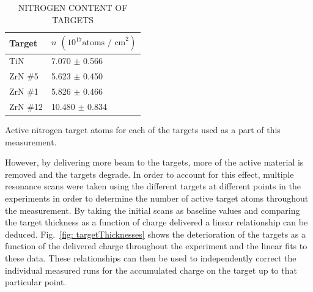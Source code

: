 \begin{table}[]
\caption{NITROGEN CONTENT OF TARGETS}
\centering
\begin{threeparttable}
\begin{tabular}{@{}ll@{}}
\toprule
Target & $n$ $\left(10^{17} \text{atoms / cm}^{2} \right)$ \\ \midrule
TiN    & 7.070 $\pm$ 0.566                        \\
ZrN \#5  & 5.623 $\pm$ 0.450                        \\
ZrN \#1  & 5.826 $\pm$ 0.466                        \\
ZrN \#12 & 10.480 $\pm$ 0.834                       \\ \bottomrule
\end{tabular}
\begin{tablenotes}
\small
\item Active nitrogen target atoms for each of the targets used as a part of this measurement. 
\end{tablenotes}
\end{threeparttable}
\label{tbl: targetAtoms}
\end{table}


However, by delivering more beam to the targets, more of the active material is removed and the targets degrade. In order to account for this effect, multiple resonance scans were taken using the different targets at different points in the experiments in order to determine the number of active target atoms throughout the measurement. By taking the initial scans as baseline values and comparing the target thickness as a function of charge delivered a linear relationship can be deduced. Fig.\ \ref{fig: targetThicknesses} shows the deterioration of the targets as a function of the delivered charge throughout the experiment and the linear fits to these data. These relationships can then be used to independently correct the individual measured runs for the accumulated charge on the target up to that particular point. 

